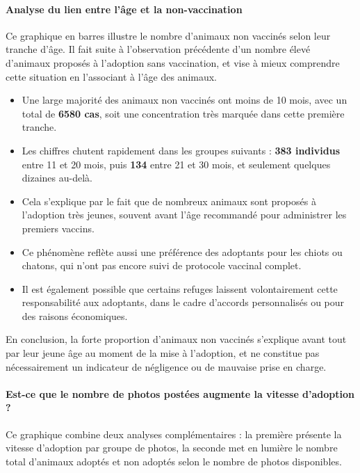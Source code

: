 \documentclass[a4paper,12pt]{article}
\begin{document}
\paragraph{Analyse du lien entre l’âge et la non-vaccination}

Ce graphique en barres illustre le nombre d’animaux non vaccinés selon leur tranche d’âge. Il fait suite à l'observation précédente d'un nombre élevé d’animaux proposés à l’adoption sans vaccination, et vise à mieux comprendre cette situation en l’associant à l’âge des animaux.

\begin{itemize}
    \item Une large majorité des animaux non vaccinés ont moins de 10 mois, avec un total de \textbf{6580 cas}, soit une concentration très marquée dans cette première tranche.
    \item Les chiffres chutent rapidement dans les groupes suivants : \textbf{383 individus} entre 11 et 20 mois, puis \textbf{134} entre 21 et 30 mois, et seulement quelques dizaines au-delà.
    \item Cela s’explique par le fait que de nombreux animaux sont proposés à l’adoption très jeunes, souvent avant l’âge recommandé pour administrer les premiers vaccins.
    \item Ce phénomène reflète aussi une préférence des adoptants pour les chiots ou chatons, qui n’ont pas encore suivi de protocole vaccinal complet.
    \item Il est également possible que certains refuges laissent volontairement cette responsabilité aux adoptants, dans le cadre d’accords personnalisés ou pour des raisons économiques.
\end{itemize}

En conclusion, la forte proportion d’animaux non vaccinés s’explique avant tout par leur jeune âge au moment de la mise à l’adoption, et ne constitue pas nécessairement un indicateur de négligence ou de mauvaise prise en charge.

\paragraph{Est-ce que le nombre de photos postées augmente la vitesse d’adoption ?}

Ce graphique combine deux analyses complémentaires : la première présente la vitesse d’adoption par groupe de photos, la seconde met en lumière le nombre total d’animaux adoptés et non adoptés selon le nombre de photos disponibles.
\end{document}
